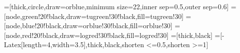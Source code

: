 
\usepackage{neuralnetwork}
\usepackage{amsmath} %
\usepackage{tikz}
\usepackage{listofitems} %
\usetikzlibrary{arrows.meta} %
\usepackage[outline]{contour} %
\contourlength{1.4pt}

\tikzset{>=latex} %
\usepackage{xcolor}

=[thick,circle,draw=orblue,minimum size=22,inner sep=0.5,outer sep=0.6]
=[node,green!20!black,draw=tugreen!30!black,fill=tugreen!30]
=[node,blue!20!black,draw=orblue!30!black,fill=orblue!30]
=[node,red!20!black,draw=logred!30!black,fill=logred!30]
=[thick,black] %
=[-{Latex[length=4,width=3.5]},thick,black,shorten <=0.5,shorten >=1]
\def\nstyle{int(\lay<\Nnodlen?min(2,\lay):3)} %
